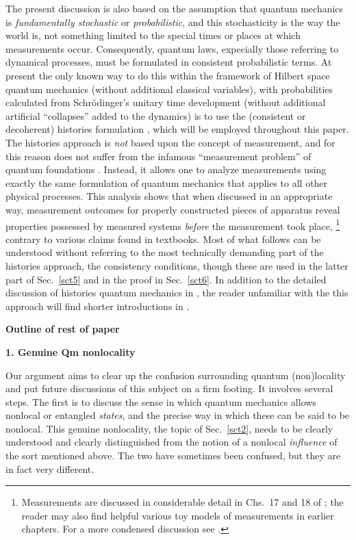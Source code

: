 \documentclass[12pt]{article} %
\def\outl#1{\par{\medskip\noindent\hspace*{.5cm}\bf
      \mathversion{bold}#1\mathversion{normal}\smallskip} }
\def\np{} \def\xa{} \def\xb{} \def\xn{} \def\xp{}
\def\outl#1{} \def\np{} \def\xa{} \def\xb{} \def\xn{} \def\xp{}
\def\outl#1{\par{\medskip\noindent\hspace*{.5cm}\bf
      \mathversion{bold}#1\mathversion{normal}\smallskip} }
\def\np{\newpage }\def\xn{\nopagebreak }\def\xp{\pagebreak }
\begin{document}
The present discussion is also based on the assumption that quantum mechanics
is \emph{fundamentally stochastic} or \emph{probabilistic}, and this
stochasticity is the way the world is, not something limited to the special
times or places at which measurements occur.  Consequently, quantum laws,
expecially those referring to dynamical processes, must be formulated in
consistent probabilistic terms.  At present the only known way to do this
within the framework of Hilbert space quantum mechanics (without additional
classical variables), with probabilities calculated from Schr\"odinger's
unitary time development (without additional artificial ``collapses'' added to
the dynamics) is to use the (consistent or decoherent) histories formulation
%
\cite{Grff84,Omns88,GMHr90,GMHr93,Grff96,Grff98,Omns99,Grff02c,GMHr07}, 
%
which will be employed throughout this paper.  The histories approach is
\emph{not} based upon the concept of measurement, and for this reason does not
suffer from the infamous ``measurement problem'' of quantum foundations
\cite{Wgnr63,BsSh96,Mttl98}.  Instead, it allows one to analyze measurements
using exactly the same formulation of quantum mechanics that applies to all
other physical processes. This analysis shows that when discussed in an
appropriate way, measurement outcomes for properly constructed pieces of
apparatus reveal properties possessed by measured systems \emph{before} the
measurement took place,%
\footnote{Measurements are discussed in considerable detail in Chs.~17 and 18
  of \cite{Grff02c}; the reader may also find helpful various toy models of
  measurements in earlier chapters.  For a more condensed discussion see
  \cite{Grff10}.} %
contrary to various claims found in textbooks.
%
Most of what follows can be understood without referring to the most
technically demanding part of the histories approach, the consistency
conditions, though these are used in the latter part of Sec.~\ref{sct5} and in
the proof in Sec.~\ref{sct6}.  In addition to the detailed discussion of
histories quantum mechanics in \cite{Grff02c}, the reader unfamiliar with the
this approach will find shorter introductions in
\cite{Grff09b,Hhnb10,Grff10}.


\xb
\outl{Outline of rest of paper}
\xa

\xb
\outl{1. Genuine Qm nonlocality}
\xa



Our argument aims to clear up the confusion surrounding quantum (non)locality
and put future discussions of this subject on a firm footing.  It involves
several steps.  The first is to discuss the sense in which quantum mechanics
allows nonlocal or entangled \emph{states}, and the precise way in which these
can be said to be nonlocal.  This genuine nonlocality, the topic of
Sec.~\ref{sct2}, needs to be clearly understood and clearly distinguished from
the notion of a nonlocal \emph{influence} of the sort mentioned above.  The
two have sometimes been confused, but they are in fact very different.
\end{document}
